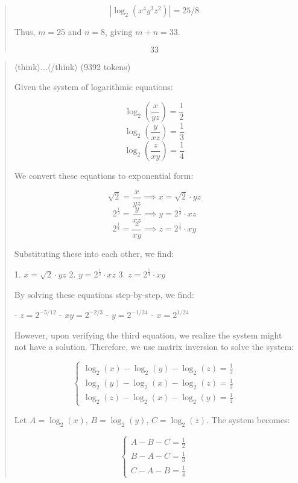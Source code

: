 {\begin{quote}
    \[| \log_2(x^4 y^3 z^2) | = 25/8\]

    Thus, $m = 25$ and $n = 8$, giving $m + n = 33$.

    \[
    \boxed{33}
    \]
    \end{quote}
}{%
    \begin{quote}
    $\langle$think$\rangle$...$\langle$/think$\rangle$ (9392 tokens)

    Given the system of logarithmic equations:

    \[
    \log_2\left(\frac{x}{yz}\right) = \frac{1}{2}
    \]
    \[
    \log_2\left(\frac{y}{xz}\right) = \frac{1}{3}
    \]
    \[
    \log_2\left(\frac{z}{xy}\right) = \frac{1}{4}
    \]

    We convert these equations to exponential form:

    \[
    \sqrt{2} = \frac{x}{yz} \implies x = \sqrt{2} \cdot yz
    \]
    \[
    2^{\frac{1}{3}} = \frac{y}{xz} \implies y = 2^{\frac{1}{3}} \cdot xz
    \]
    \[
    2^{\frac{1}{4}} = \frac{z}{xy} \implies z = 2^{\frac{1}{4}} \cdot xy
    \]

    Substituting these into each other, we find:

    1. $x = \sqrt{2} \cdot yz$
    2. $y = 2^{\frac{1}{3}} \cdot xz$
    3. $z = 2^{\frac{1}{4}} \cdot xy$

    By solving these equations step-by-step, we find:

    - $z = 2^{-5/12}$
    - $xy = 2^{-2/3}$
    - $y = 2^{-1/24}$
    - $x = 2^{1/24}$

    However, upon verifying the third equation, we realize the system might not have a solution. Therefore, we use matrix inversion to solve the system:

    \[
    \begin{cases}
    \log_2(x) - \log_2(y) - \log_2(z) = \frac{1}{2} \\
    \log_2(y) - \log_2(x) - \log_2(z) = \frac{1}{3} \\
    \log_2(z) - \log_2(x) - \log_2(y) = \frac{1}{4}
    \end{cases}
    \]

    Let $A = \log_2(x)$, $B = \log_2(y)$, $C = \log_2(z)$. The system becomes:

    \[
    \begin{cases}
    A - B - C = \frac{1}{2} \\
    B - A - C = \frac{1}{3} \\
    C - A - B = \frac{1}{4}
    \end{cases}
    \]


\end{quote}}
